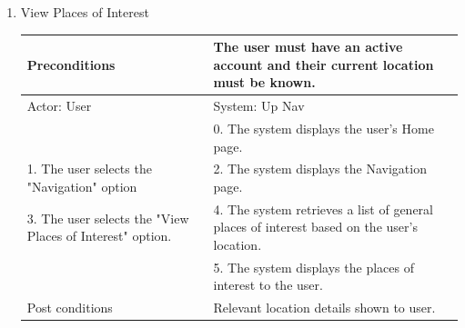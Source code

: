 \documentclass{article}
\begin{document}
\begin{center}
\begin{enumerate}
\begin{enumerate}
	\item{View Places of Interest}
	\begin{table}[]
	\centering
		\begin{tabular}{ | m{15em} | m{15em}| }
		\hline
		Preconditions                                             				& The user must have an active account and their current location must be known. \\ 
		\hline
		Actor: User                                              				& System: Up Nav \\
		 \hline
                                                          							& 0. The system displays the user's Home page. \\
		\hline
		1. The user selects the "Navigation" option				& 2. The system displays the Navigation page. \\
		\hline
		3. The user selects the "View Places of Interest" option. 		& 4. The system retrieves a list of general places of interest based on the user's location. \\ 
		\hline
                                                          							& 5. The system displays the places of interest to the user. \\ 
		\hline
		Post conditions								& Relevant location details shown to user. \\
		\hline
		\end{tabular}
	\end{table}


\end{enumerate}
\end{enumerate}
\end{center}
\end{document}
